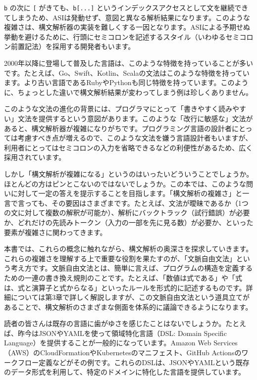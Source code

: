 \texttt{b} の次に \texttt{{[}} がきても、\texttt{b{[}...{]}}
というインデックスアクセスとして文を継続できてしまうため、ASIは発動せず、意図と異なる解析結果になります。このような複雑さは、構文解析器の実装を難しくする一因となります。ASIによる予期せぬ挙動を避けるために、行頭にセミコロンを記述するスタイル（いわゆるセミコロン前置記法）を採用する開発者もいます。

2000年以降に登場して普及した言語は、このような特徴を持っていることが多いです。たとえば、Go、Swift、Kotlin、Scalaの文法はこのような特徴を持っています。より古い言語であるRubyやPythonも同じ特徴を持っています。このように、ちょっとした違いで構文解析結果が変わってしまう例は珍しくありません。

このような文法の進化の背景には、プログラマにとって「書きやすく読みやすい」文法を提供するという意図があります。このような「改行に敏感な」文法があると、構文解析器が複雑になりがちです。プログラミング言語の設計者にとっては考慮すべき点が増えるので、このような文法を嫌う言語設計者もいますが、利用者にとってはセミコロンの入力を省略できるなどの利便性があるため、広く採用されています。

しかし「構文解析が複雑になる」というのはいったいどういうことでしょうか。ほとんどの方はピンとこないのではないでしょうか。この本では、このような問いに対して一定の答えを提示することを目指します。「構文解析の複雑さ」と一言で言っても、その要因はさまざまです。たとえば、文法が曖昧であるか（1つの文に対して複数の解釈が可能か）、解析にバックトラック（試行錯誤）が必要か、どれだけの先読みトークン（入力の一部を先に見る数）が必要か、といった要素が複雑さに関わってきます。

本書では、これらの概念に触れながら、構文解析の奥深さを探求していきます。これらの複雑さを理解する上で重要な役割を果たすのが、「文脈自由文法」という考え方です。文脈自由文法とは、簡単に言えば、プログラムの構造を定義するための一連の書き換え規則のことです。たとえば、「数値は式である」や「式は、式と演算子と式からなる」といったルールを形式的に記述するものです。詳細については第3章で詳しく解説しますが、この文脈自由文法という道具立てがあることで、構文解析のさまざまな側面を体系的に議論できるようになります。

読者の皆さんは既存の言語に歯がゆさを感じたことはないでしょうか。たとえば、昨今はJSONやYAMLを使って領域特化言語（DSL: Domain Specific Language）を提供することが一般的になっています。Amazon Web
Services（AWS）のCloudFormationやKubernetesのマニフェスト、GitHub
Actionsのワークフロー定義などがその例です。これらのDSLは、JSONやYAMLという既存のデータ形式を利用して、特定のドメインに特化した言語を提供しています。

